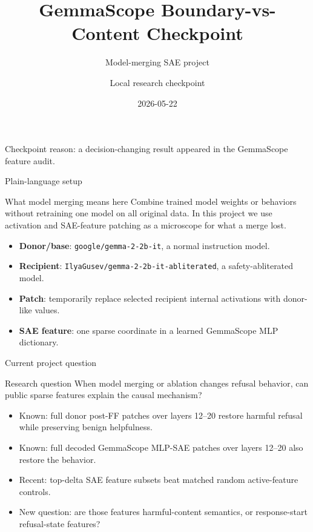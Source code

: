 \documentclass[aspectratio=169]{beamer}
\title[GemmaScope Boundary/Content]{GemmaScope Boundary-vs-Content Checkpoint}
\subtitle{Model-merging SAE project}
\author{Local research checkpoint}
\date{2026-05-22}
\begin{document}
\begin{frame}
  \titlepage
  \vspace{-0.5em}
  \begin{center}
    \small Checkpoint reason: a decision-changing result appeared in the GemmaScope feature audit.
  \end{center}
\end{frame}

\begin{frame}{Plain-language setup}
  \begin{block}{What model merging means here}
    Combine trained model weights or behaviors without retraining one model on all original data.
    In this project we use activation and SAE-feature patching as a microscope for what a merge lost.
  \end{block}
  \begin{itemize}
    \item \textbf{Donor/base}: \texttt{google/gemma-2-2b-it}, a normal instruction model.
    \item \textbf{Recipient}: \texttt{IlyaGusev/gemma-2-2b-it-abliterated}, a safety-abliterated model.
    \item \textbf{Patch}: temporarily replace selected recipient internal activations with donor-like values.
    \item \textbf{SAE feature}: one sparse coordinate in a learned GemmaScope MLP dictionary.
  \end{itemize}
\end{frame}

\begin{frame}{Current project question}
  \begin{block}{Research question}
    When model merging or ablation changes refusal behavior, can public sparse features explain the causal mechanism?
  \end{block}
  \begin{itemize}
    \item Known: full donor post-FF patches over layers 12--20 restore harmful refusal while preserving benign helpfulness.
    \item Known: full decoded GemmaScope MLP-SAE patches over layers 12--20 also restore the behavior.
    \item Recent: top-delta SAE feature subsets beat matched random active-feature controls.
    \item New question: are those features harmful-content semantics, or response-start refusal-state features?
  \end{itemize}
\end{frame}
\end{document}
